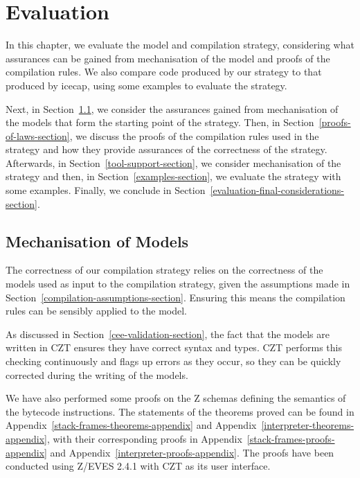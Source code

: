 \chapter{Evaluation}
\label{evaluation-chapter}

In this chapter, we evaluate the model and compilation strategy,
considering what assurances can be gained from mechanisation of the
model and proofs of the compilation rules.
We also compare code produced by our strategy to that produced by icecap,
using some examples to evaluate the strategy.

Next, in Section~\ref{mechanisation-of-models-section}, we consider
the assurances gained from mechanisation of the models that form the
starting point of the strategy.
Then, in Section~\ref{proofs-of-laws-section}, we discuss the proofs of
the compilation rules used in the strategy and how they provide
assurances of the correctness of the strategy.
Afterwards, in Section~\ref{tool-support-section}, we consider
mechanisation of the strategy and then, in
Section~\ref{examples-section}, we evaluate the strategy with some
examples.
Finally, we conclude in
Section~\ref{evaluation-final-considerations-section}.


\section{Mechanisation of Models}
\label{mechanisation-of-models-section}

The correctness of our compilation strategy relies on the correctness
of the models used as input to the compilation strategy, given the
assumptions made in Section~\ref{compilation-assumptions-section}.
Ensuring this means the compilation rules can be sensibly applied to
the model.

As discussed in Section~\ref{cee-validation-section}, the fact that
the models are written in CZT ensures they have correct syntax and
types.
CZT performs this checking continuously and flags up errors as they
occur, so they can be quickly corrected during the writing of the
models.

We have also performed some proofs on the Z schemas defining the
semantics of the bytecode instructions.
The statements of the theorems proved can be found in
Appendix~\ref{stack-frames-theorems-appendix} and
Appendix~\ref{interpreter-theorems-appendix}, with their corresponding
proofs in Appendix~\ref{stack-frames-proofs-appendix} and
Appendix~\ref{interpreter-proofs-appendix}.
The proofs have been conducted using Z/EVES 2.4.1 with CZT as its user
interface.

